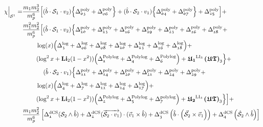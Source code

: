 \begin{tcolorbox}[thesisresultbox, title=\textit{Spinning Eikonal at 3PM}]
\restorethesisbodyformat
\begin{align}\label{dC7Snew}
 \chi\Big|_{\mathcal{S}^1}=&\frac{m_1 m_2^3}{m_p^6}\Big[(\hat b\cdot\mathcal{S}_1\cdot v_2)\Big\{ \Delta_{\mathfrak{03}}^{\textrm{poly}}+\Delta_{\mathfrak{06}}^{\textrm{poly}} \Big\}+(\hat b\cdot\mathcal{S}_2\cdot v_1)\Big\{ \Delta_{\mathfrak{04}}^{\textrm{poly}}+\Delta_{\mathfrak{07}}^{\textrm{poly}} \Big\}+\Delta_{\mathfrak{25}}^{\textrm{poly}}\Big]+ \\ &
\frac{m_1^2 m_2^2}{m_p^6}\Big[(\hat b\cdot \mathcal{S}_1\cdot v_2)\Big\{\Delta_{\mathfrak{10}}^{\textrm{poly}}+\Delta_{\mathfrak{13}}^{\textrm{poly}}+\Delta_{\mathfrak{16}}^{\textrm{poly}}+\Delta_{\mathfrak{19}}^{\textrm{poly}}+\Delta_{\mathfrak{23}}^{\textrm{poly}}+\Delta_{\mathfrak{26}}^{\textrm{poly}}+\Delta_{\mathfrak{28}}^{\textrm{poly}}\nonumber+\\ &\hspace{0.8cm}\log(x)\Big(\Delta_{\mathfrak{3}}^{\textrm{log}}+\Delta_{\mathfrak{06}}^{\textrm{log}}+\Delta_{\mathfrak{08}}^{\textrm{log}}+\Delta_{\mathfrak{10}}^{\textrm{log}}+\Delta_{\mathfrak{13}}^{\textrm{log}}+\Delta_{\mathfrak{16}}^{\textrm{log}}+\Delta_{\mathfrak{18}}^{\textrm{log}}\Big)\nonumber+\\ &\hspace{0.8cm}
(\log^2 x+\textbf{Li}_2(1-x^2))\Big(\Delta_{\mathfrak{1}}^{\textrm{Polylog}}+\Delta_{\mathfrak{4}}^{\textrm{Polylog}}+\Delta_{\mathfrak{6}}^{\textrm{Polylog}}\Big)+\boldsymbol{\mathfrak{U}_1}^{\textrm{LI}_3}\,\boldsymbol{\mathfrak{(UT)}}_3\Big\}\nonumber+\\ & \hspace{1.2cm}(\hat b\cdot \mathcal{S}_2\cdot v_1)\Big\{\Delta_{\mathfrak{11}}^{\textrm{poly}}+\Delta_{\mathfrak{14}}^{\textrm{poly}}+\Delta_{\mathfrak{20}}^{\textrm{poly}}+\Delta_{\mathfrak{21}}^{\textrm{poly}}+\Delta_{\mathfrak{24}}^{\textrm{poly}}+\Delta_{\mathfrak{29}}^{\textrm{poly}}\nonumber+\\&\hspace{0.8cm}\log(x)\Big(\Delta_{\mathfrak{4}}^{\textrm{log}}+\Delta_{\mathfrak{7}}^{\textrm{log}}+\Delta_{\mathfrak{11}}^{\textrm{log}}+\Delta_{\mathfrak{14}}^{\textrm{log}}+\Delta_{\mathfrak{17}}^{\textrm{log}}\Big)\nonumber+\\ &\hspace{0.8cm}(\log^2 x+\textbf{Li}_2(1-x^2))\Big(\Delta_{\mathfrak{2}}^{\textrm{Polylog}}+\Delta_{\mathfrak{5}}^{\textrm{Polylog}}+\Delta_{\mathfrak{7}}^{\textrm{polylog}}\Big)+\boldsymbol{\mathfrak{U}_2}^{\textrm{LI}_3}\,\boldsymbol{\mathfrak{(UT)}}_3\Big\}\Big]\nonumber+\\ &
 \frac{m_1 m_2^2 }{m_p^6}\left[\Delta_{\mathfrak{1}}^{\textrm{dCS}}(\mathcal{S}_2\wedge \hat b )+\Delta_{\mathfrak{2}}^{\textrm{dCS}}(\overrightarrow{\mathcal{S}_2\cdot v_1})\cdot (\vec v_1\times \hat b)+\Delta_{\mathfrak{3}}^{\textrm{dCS}}\left(\hat b\cdot \left(\vec{\mathcal{S}}_2\times \vec v_1\right)\right)+\Delta_{\mathfrak{4}}^{\textrm{dCS}}\left(\hat{\mathcal{S}}_2\wedge \hat b\right)\right]
\,\nonumber
    \end{align} 
\end{tcolorbox}
\restorethesisbodyformat

